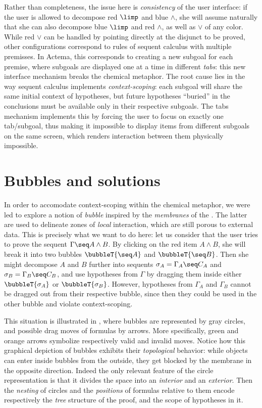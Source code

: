Rather than completeness, the issue here is \emph{consistency} of the user
interface: if the user is allowed to decompose red $\limp$ and blue $\land$, she
will assume naturally that she can also decompose blue $\limp$ and red $\land$,
as well as $\lor$ of any color. While red $\lor$ can be handled by pointing
directly at the disjunct to be proved, other configurations correspond to rules
of sequent calculus with multiple premisses. In Actema, this corresponds to
creating a new subgoal for each premise, where subgoals are displayed one at a
time in different \emph{tabs}: this new interface mechanism breaks the chemical
metaphor. The root cause lies in the way sequent calculus implements
\emph{context-scoping}: each subgoal will share the same initial context of
hypotheses, but future hypotheses ``buried'' in the conclusions must be
available only in their respective subgoals. The tabs mechanism implements this
by forcing the user to focus on exactly one tab/subgoal, thus making it
impossible to display items from different subgoals on the same screen, which
renders interaction between them physically impossible.


\section{Bubbles and solutions}

In order to accomodate context-scoping within the chemical metaphor, we were led
to explore a notion of \emph{bubble} inspired by the \emph{membranes} of the
{\cham} \cite{berry_chemical_1989}. The latter are used to delineate zones of
\emph{local} interaction, which are still porous to external data. This is
precisely what we want to do here: let us consider that the user tries to prove
the sequent $\Gamma \seq A \land B$. By clicking on the red item $A \land B$,
she will break it into two bubbles $\bubbleT{\seq A}$ and $\bubbleT{\seq B}$.
Then she might decompose $A$ and $B$ further into sequents $\sigma_A = \Gamma_A
\seq C_A$ and $\sigma_B = \Gamma_B \seq C_B$, and use hypotheses from $\Gamma$
by dragging them inside either $\bubbleT{\sigma_A}$ or $\bubbleT{\sigma_B}$.
However, hypotheses from $\Gamma_A$ and $\Gamma_B$ cannot be dragged out from
their respective bubble, since then they could be used in the other bubble and
violate context-scoping.

This situation is illustrated in , where bubbles are
represented by gray circles, and possible drag moves of formulas by arrows. More
specifically, green and orange arrows symbolize respectively valid and invalid
moves. Notice how this graphical depiction of bubbles exhibits their
\emph{topological} behavior: while objects can enter inside bubbles from the
outside, they get blocked by the membrane in the opposite direction. Indeed the
only relevant feature of the circle representation is that it divides the space
into an \emph{interior} and an \emph{exterior}. Then the \emph{nesting} of
circles and the \emph{positions} of formulas relative to them encode
respectively the \emph{tree} structure of the proof, and the scope of hypotheses
in it.

